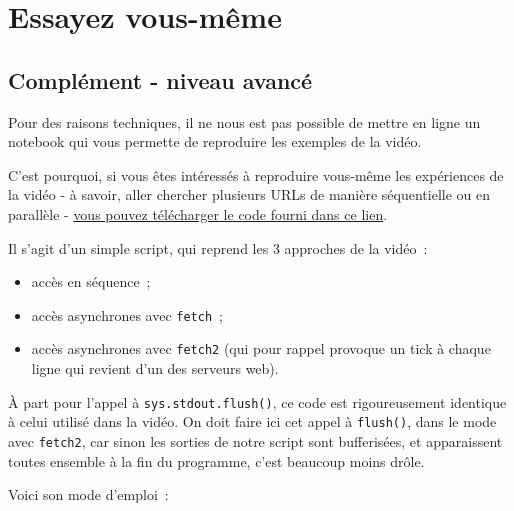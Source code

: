     
    
    
    

    

    \hypertarget{essayez-vous-muxeame}{%
\section{Essayez vous-même}\label{essayez-vous-muxeame}}

    \hypertarget{compluxe9ment---niveau-avancuxe9}{%
\subsection{Complément - niveau
avancé}\label{compluxe9ment---niveau-avancuxe9}}

    Pour des raisons techniques, il ne nous est pas possible de mettre en
ligne un notebook qui vous permette de reproduire les exemples de la
vidéo.

    C'est pourquoi, si vous êtes intéressés à reproduire vous-même les
expériences de la vidéo - à savoir, aller chercher plusieurs URLs de
manière séquentielle ou en parallèle - \href{data/async_http.py}{vous
pouvez télécharger le code fourni dans ce lien}.

    Il s'agit d'un simple script, qui reprend les 3 approches de la vidéo~:

\begin{itemize}
\tightlist
\item
  accès en séquence~;
\item
  accès asynchrones avec \texttt{fetch}~;
\item
  accès asynchrones avec \texttt{fetch2} (qui pour rappel provoque un
  tick à chaque ligne qui revient d'un des serveurs web).
\end{itemize}

À part pour l'appel à \texttt{sys.stdout.flush()}, ce code est
rigoureusement identique à celui utilisé dans la vidéo. On doit faire
ici cet appel à \texttt{flush()}, dans le mode avec \texttt{fetch2}, car
sinon les sorties de notre script sont bufferisées, et apparaissent
toutes ensemble à la fin du programme, c'est beaucoup moins drôle.

    Voici son mode d'emploi~:

    \begin{Shaded}
\begin{Highlighting}[frame=lines,framerule=0.6mm,rulecolor=\color{asisframecolor}]
\OperatorTok{--}
\NormalTok{usage: async_http.py [}\OperatorTok{-}\NormalTok{h] [}\OperatorTok{-}\NormalTok{s] [}\OperatorTok{-}\NormalTok{d] [urls [urls ...]]}


\end{Highlighting}
\end{Shaded}

